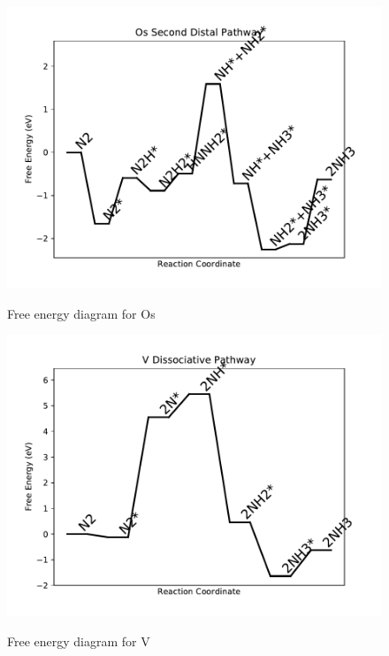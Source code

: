 \documentclass[journal=jacsat,manuscript=article]{achemso}
\begin{document}
\begin{figure}
\includegraphics[width=1\linewidth]{data/plots/Os_distal_2.pdf}
\label{fig:Os_distal_2}
\caption{Free energy diagram for Os}
\end{figure}

\newpage
\begin{figure}
\includegraphics[width=1\linewidth]{data/plots/V_dissociative.pdf}
\label{fig:V_dissociative}
\caption{Free energy diagram for V}
\end{figure}
\end{document}
